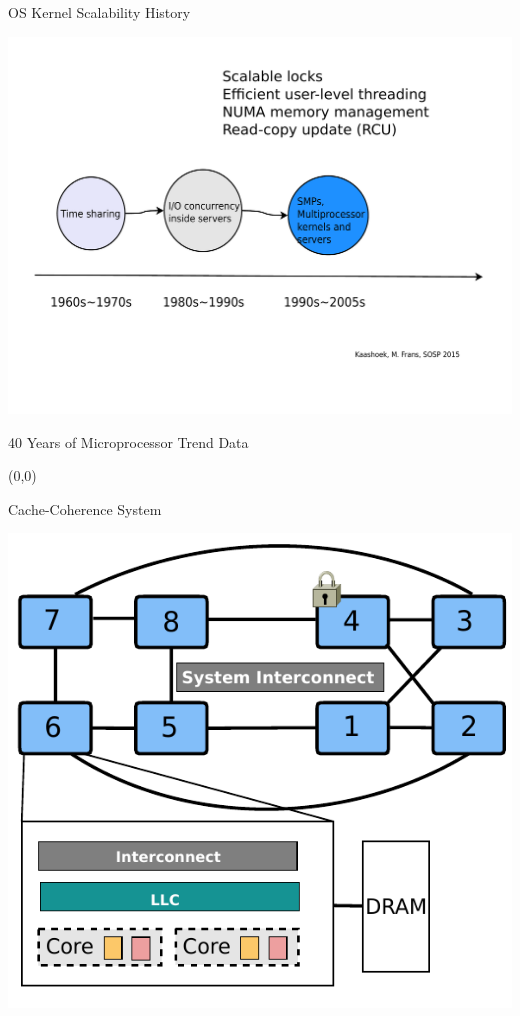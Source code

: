 \documentclass[english]{beamer} %
\begin{document}
\begin{frame}{OS Kernel Scalability History}
\begin{center}
\includegraphics[scale=0.3]{fig/history_old}
\end{center}
\end{frame}


\begin{frame}{40 Years of Microprocessor Trend Data}
\begin{textblock}{1}(0,0)
\end{textblock}
\end{frame}


\begin{frame}{Cache-Coherence System}
\begin{center}
\includegraphics[scale=0.8]{fig/archcache_1}
\end{center}
\end{frame}
\end{document}

